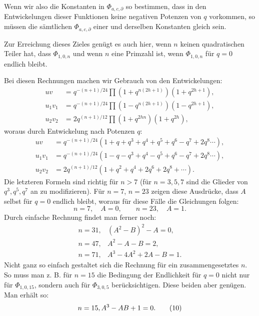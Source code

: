 \documentclass[11pt]{article}
\begin{document}
Wenn wir also die Konstanten in $\Phi_{a,c,\partial}$ so bestimmen, dass in den Entwickelungen dieser Funktionen keine negativen Potenzen von $q$ vorkommen, so müssen die sämtlichen $\Phi_{a,c,\partial}$ einer und derselben Konstanten gleich sein.

Zur Erreichung dieses Zieles genügt es auch hier, wenn $n$ keinen quadratischen Teiler hat, dass $\Phi_{1,0,n}$ und wenn $n$ eine Primzahl ist, wenn $\Phi_{1,0,n}$ für $q=0$ endlich bleibt.

Bei diesen Rechnungen machen wir Gebrauch von den Entwickelungen:
\begin{equation}
\begin{aligned}
uv&=q^{-(n+1)/24}\prod(1+q^{n(2h+1)})(1+q^{2h+1}),\\
u_1v_1&=q^{-(n+1)/24}\prod(1-q^{n(2h+1)})(1-q^{2h+1}),\\
u_2v_2&=2q^{(n+1)/12}\prod(1+q^{2hn})(1+q^{2h}),
\end{aligned}
\tag{6}
\end{equation}
woraus durch Entwickelung nach Potenzen $q$:
\begin{equation}
\begin{aligned}
uv&=q^{-(n+1)/24}(1+q+q^3+q^4+q^5+q^6-q^7+2q^8\cdots),\\
u_1v_1&=q^{-(n+1)/24}(1-q-q^3+q^4-q^5+q^6-q^7+2q^8\cdots),\\
u_2v_2&=2q^{(n+1)/12}(1+q^2+q^4+2q^6+2q^8+\cdots).
\end{aligned}
\tag{7}
\end{equation}
Die letzteren Formeln sind richtig für $n>7$ (für $n=3,5,7$ sind die Glieder von $q^3,q^5,q^7$ an zu modifizieren). Für $n=7$, $n=23$ zeigen diese Ausdrücke, dass $A$ selbst für $q=0$ endlich bleibt, woraus für diese Fälle die Gleichungen folgen:
\begin{equation}
 n=7,\quad A=0,\qquad n=23,\quad A=1.
\tag{8}
\end{equation}
Durch einfache Rechnung findet man ferner noch:
\begin{equation}
\begin{array}{rl}
n=31,& (A^2-B)^2-A=0,\\
n=47,& A^2-A-B=2,\\
n=71,& A^3-4A^2+2A-B=1.
\end{array}
\tag{9}
\end{equation}
Nicht ganz so einfach gestaltet sich die Rechnung für ein zusammengesetztes $n$. So muss man z. B. für $n=15$ die Bedingung der Endlichkeit für $q=0$ nicht nur für $\Phi_{1,0,15}$, sondern auch für $\Phi_{3,0,5}$ berücksichtigen. Diese beiden aber genügen. Man erhält so:
\begin{equation}
 n=15,\\ A^3-AB+1=0.
\tag{10}
\end{equation}
\end{document}
